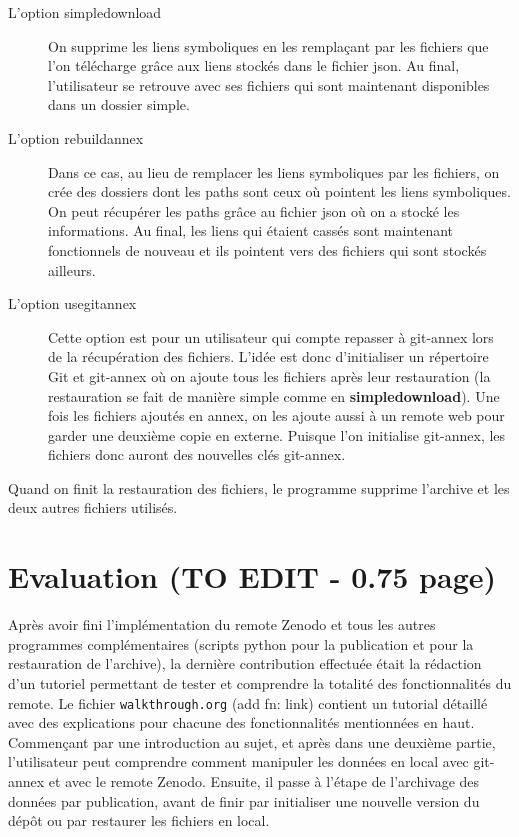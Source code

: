 \documentclass[11pt]{article}
\begin{document}
\begin{description}
\item[{L'option simpledownload}] On supprime les liens symboliques en les remplaçant par les fichiers
que l'on télécharge grâce aux liens stockés dans le fichier json. Au
final, l'utilisateur se retrouve avec ses fichiers qui sont
maintenant disponibles dans un dossier simple.

\item[{L'option rebuildannex}] Dans ce cas, au lieu de remplacer les liens symboliques par les
fichiers, on crée des dossiers dont les paths sont ceux où pointent
les liens symboliques. On peut récupérer les paths grâce au fichier
json où on a stocké les informations.
Au final, les liens qui étaient cassés sont maintenant fonctionnels
de nouveau et ils pointent vers des fichiers qui sont stockés ailleurs.

\item[{L'option usegitannex}] Cette option est pour un utilisateur qui compte repasser à git-annex
lors de la récupération des fichiers. L'idée est donc d'initialiser
un répertoire Git et git-annex où on ajoute tous les fichiers après
leur restauration (la restauration se fait de manière simple comme
en \textbf{simpledownload}). Une fois les fichiers ajoutés en annex, on les
ajoute aussi à un remote web pour garder une deuxième copie en
externe.
Puisque l'on initialise git-annex, les fichiers donc auront des
nouvelles clés git-annex.
\end{description}

Quand on finit la restauration des fichiers, le programme supprime
l'archive et les deux autres fichiers utilisés.
\section{Evaluation (TO EDIT - 0.75 page)}
\label{sec:orgfbe6060}
Après avoir fini l'implémentation du remote Zenodo et tous les autres
programmes complémentaires (scripts python pour la publication et pour
la restauration de l'archive), la dernière contribution effectuée
était la rédaction d'un tutoriel permettant de tester et comprendre la
totalité des fonctionnalités du remote. Le fichier \texttt{walkthrough.org}
(add fn: link) contient un tutorial détaillé avec des
explications pour chacune des fonctionnalités mentionnées en
haut. Commençant par une introduction au sujet, et après dans une
deuxième partie, l'utilisateur peut comprendre comment manipuler les
données en local avec git-annex et avec le remote Zenodo. Ensuite, il
passe à l'étape de l'archivage des données par publication, avant de
finir par initialiser une nouvelle version du dépôt ou par restaurer
les fichiers en local.
\end{document}
